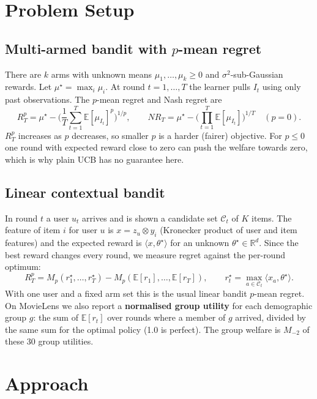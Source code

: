 \documentclass[11pt,a4paper]{article}
\newcommand{\E}{\mathbb{E}}
\newcommand{\R}{\mathbb{R}}
\begin{document}
\section{Problem Setup}

\subsection{Multi-armed bandit with $p$-mean regret}
There are $k$ arms with unknown means $\mu_1,\dots,\mu_k\ge 0$ and $\sigma^2$-sub-Gaussian rewards. Let $\mu^\star=\max_i\mu_i$. At round $t=1,\dots,T$ the learner pulls $I_t$ using only past observations. The $p$-mean regret and Nash regret are
\[
R^p_T=\mu^\star-\Big(\frac1T\sum_{t=1}^T \E[\mu_{I_t}]^p\Big)^{1/p},\qquad
NR_T=\mu^\star-\Big(\prod_{t=1}^T \E[\mu_{I_t}]\Big)^{1/T}\quad(p=0).
\]
$R^p_T$ increases as $p$ decreases, so smaller $p$ is a harder (fairer) objective. For $p\le 0$ one round with expected reward close to zero can push the welfare towards zero, which is why plain UCB has no guarantee here.

\subsection{Linear contextual bandit}
In round $t$ a user $u_t$ arrives and is shown a candidate set $\mathcal{C}_t$ of $K$ items. The feature of item $i$ for user $u$ is $x=z_u\otimes y_i$ (Kronecker product of user and item features) and the expected reward is $\langle x,\theta^\star\rangle$ for an unknown $\theta^\star\in\R^d$. Since the best reward changes every round, we measure regret against the per-round optimum:
\[
R^p_T=M_p(r^\star_1,\dots,r^\star_T)-M_p(\E[r_1],\dots,\E[r_T]),\qquad r^\star_t=\max_{a\in\mathcal{C}_t}\langle x_a,\theta^\star\rangle .
\]
With one user and a fixed arm set this is the usual linear bandit $p$-mean regret. On MovieLens we also report a \textbf{normalised group utility} for each demographic group $g$: the sum of $\E[r_t]$ over rounds where a member of $g$ arrived, divided by the same sum for the optimal policy (1.0 is perfect). The group welfare is $M_{-2}$ of these 30 group utilities.

\section{Approach}
\end{document}
